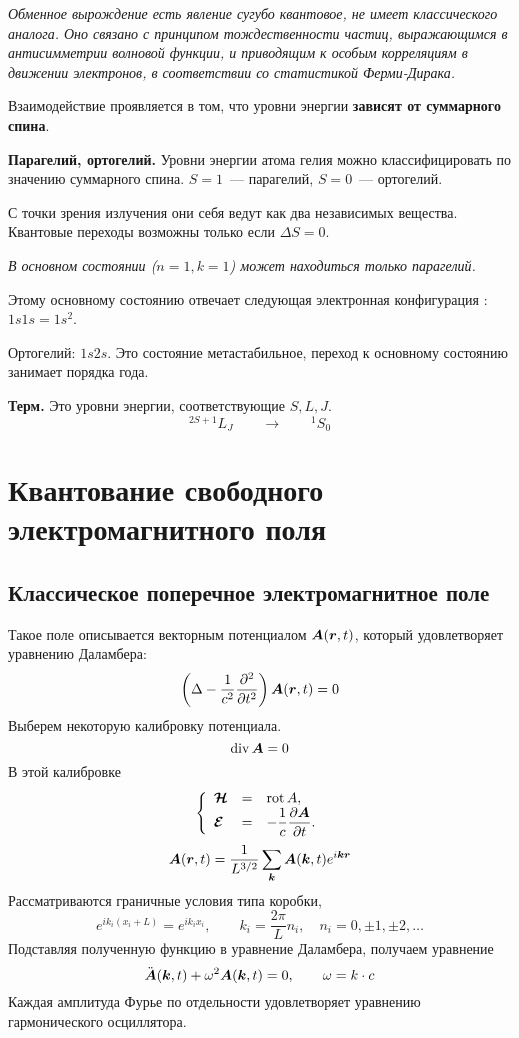 \emph{Обменное вырождение есть явление сугубо квантовое, не имеет классического аналога. Оно связано с принципом тождественности частиц, выражающимся в антисимметрии волновой функции, и приводящим к особым корреляциям в движении электронов, в соответствии со статистикой Ферми-Дирака.}

Взаимодействие проявляется в том, что уровни энергии \textbf{зависят от суммарного спина}.

\textbf{Парагелий, ортогелий.} Уровни энергии атома гелия можно классифицировать по значению суммарного спина. $S = 1$~--- парагелий, $S = 0$~--- ортогелий.

С точки зрения излучения они себя ведут как два независимых вещества. Квантовые переходы возможны только если $\Delta S = 0$.

\emph{В основном состоянии ($n = 1, k = 1$) может находиться только парагелий.}

Этому основному состоянию отвечает следующая электронная конфигурация : $1s1s = 1s^2$.

Ортогелий: $1s2s$. Это состояние метастабильное, переход к основному состоянию занимает порядка года.

\textbf{Терм.} Это уровни энергии, соответствующие $S, L, J$.
$$
    {}^{2S + 1} {L}_{J} \qquad \to \qquad \boxed{
    {}^{1} {S}_{0}
}
$$

\section{Квантование свободного электромагнитного поля}
\subsection{Классическое поперечное электромагнитное поле}
Такое поле описывается векторным потенциалом $\bf A(\bf r, t)$, который удовлетворяет уравнению Даламбера:
$$
    \left(
    \Delta - \dfrac{1}{c^2} \dfrac{\pd^2}{\pd t^2}
\right) \bf A (\bf r, t) = 0
$$
Выберем некоторую калибровку потенциала.
$$
    \mathrm{div} \, \bf A = 0
$$
В этой калибровке
\def \rot {\mathrm{rot}\,}
\def \div {\mathrm{div}\,}
\def \H {\mathcal H}
\def \E {\mathcal E}
$$
    \left\{
      \begin{array}{lcl}
        \bf {\mathcal H} & = & \rot A ,\\
        \bf {\mathcal E} & = & -\dfrac{1}{c} \ud{\bf A}{t}.
      \end{array}
    \right.
$$
$$
    \bf A (\bf r, t) = \dfrac{1}{L^{3/2}} \sum_{\bf k} \bf A(\bf k, t) e^{i \bf k \bf r}
$$
Рассматриваются граничные условия типа коробки,
$$
    e^{i k_i (x_i + L)} = e^{i k_i x_i}, \qquad k_i = \dfrac{2 \pi}{L} n_i, \quad n_i = 0, \pm 1, \pm 2, \ldots
$$
Подставляя полученную функцию в уравнение Даламбера, получаем уравнение
$$
    \ddot{\bf A} (\bf k, t) + \omega^2 \bf A(\bf k, t) = 0, \qquad \omega = k \cdot c
$$
Каждая амплитуда Фурье по отдельности удовлетворяет уравнению гармонического осциллятора.

